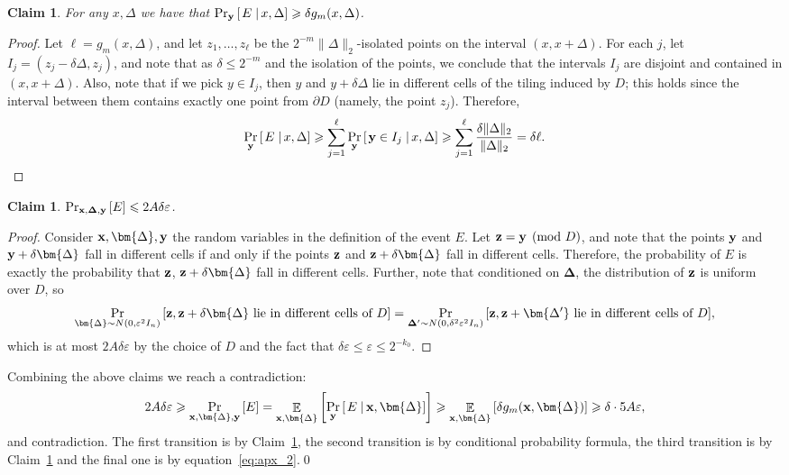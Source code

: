 \documentclass[10pt,a4paper]{article}
\newtheorem{claim}[thm]{Claim}
\newcommand\Prob[2]{{\Pr_{#1}\left[ {#2} \right]}}
\newcommand\cProb[3]{{\Pr_{#1}\left[ \left. #3 \;\right\vert #2 \right]}}
\newcommand\Expect[2]{{\mathop{\mathbb{E}}_{#1}\left[ {#2} \right]}}
\newcommand\norm[1]{\| #1 \|}
\newcommand\eps{\varepsilon}
\renewcommand\geq{\geqslant}
\renewcommand\leq{\leqslant}
\newcommand{\De}{\Delta}
\begin{document}
    \begin{claim}\label{claim:apx_one}
     For any $x,\De$ we have that $\cProb{{\bf y}}{x,\De}{E}\geq \delta g_m(x,\De)$.
    \end{claim}
    \begin{proof}
    Let $\ell = g_m(x,\De)$, and let $z_1,\ldots,z_{\ell}$ be the $2^{-m}\norm{\De}_2$-isolated points on the interval
    $(x,x+\De)$. For each $j$, let
    $I_j = (z_j - \delta\De,z_j)$, and note that as $\delta\leq 2^{-m}$ and the isolation of the points, we conclude that
    the intervals $I_j$ are disjoint and contained in $(x,x+\De)$.
    Also, note that if we pick $y\in I_j$, then $y$ and $y+\delta \De$ lie in different cells of the tiling induced by $D$;
    this holds since the interval between them contains exactly one point from $\partial D$ (namely, the point $z_j$). Therefore,
    \[
    \cProb{{\bf y}}{x,\De}{E}
    \geq\sum\limits_{j=1}^{\ell} \cProb{{\bf y}}{x,\De}{{\bf y}\in I_j}
    \geq\sum\limits_{j=1}^{\ell} \frac{\delta\norm{\De}_2}{\norm{\De}_2}
    =\delta\ell.\qedhere
    \]
    \end{proof}

   \begin{claim}\label{claim:apx_two}
     $\Prob{{\bf x},{\bf \De},{\bf y}}{E}\leq 2A\delta\eps$.
   \end{claim}
   \begin{proof}
      Consider ${\bf x},\bm{\De},{\bf y}$ the random variables in the definition of the event $E$. Let ${\bf z} = {\bf y}\pmod{D}$,
      and note that the points ${\bf y}$ and ${\bf y}+\delta\bm{\De}$ fall in different cells if and only if the points ${\bf z}$ and
      ${\bf z}+\delta\bm{\De}$ fall in different cells. Therefore, the probability of $E$ is exactly the probability that ${\bf z}$, ${\bf z}+\delta\bm{\De}$
      fall in different cells. Further, note that conditioned on $\bm{\De}$, the distribution of ${\bf z}$ is uniform over $D$, so
      \[
      \Prob{\bm{\De}\sim N(0,\eps^2 I_n)}{{\bf z}, {\bf z}+\delta\bm{\De}\text{ lie in different cells of } D}
      =\Prob{{\bf \De'}\sim N(0,\delta^2\eps^2 I_n)}{{\bf z}, {\bf z}+\bm{\De'}\text{ lie in different cells of }D},
      \]
      which is at most $2A\delta\eps$ by the choice of $D$ and the fact that $\delta\eps\leq \eps\leq 2^{-k_0}$.
    \end{proof}

    Combining the above claims we reach a contradiction:
    \[
    2A\delta\eps
    \geq
    \Prob{{\bf x},\bm{\De},{\bf y}}{E}
    =\Expect{{\bf x},\bm{\De}}{\cProb{{\bf y}}{{\bf x},\bm{\De}}{E}}
    \geq
    \Expect{{\bf x},\bm{\De}}{\delta g_m({\bf x},\bm{\De})}
    \geq \delta\cdot 5A\eps,
    \]
    and contradiction. The first transition is by Claim~\ref{claim:apx_one}, the second
    transition is by conditional probability formula, the third transition is by Claim~\ref{claim:apx_two}
    and the final one is by equation~\eqref{eq:apx_2}.\qed
\end{document}
